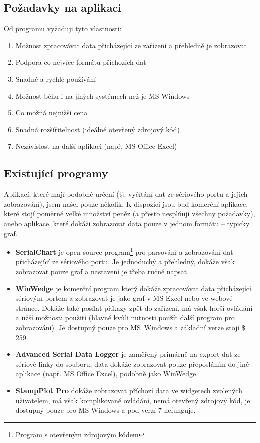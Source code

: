 \documentclass[12pt, a4paper, oneside]{article}
\begin{document}
\subsection*{Požadavky na aplikaci}
Od programu vyžaduji tyto vlastnosti:
\begin{enumerate}
    \item Možnost zpracovávat data přicházející ze zařízení a přehledně je zobrazovat %
    \item Podpora co nejvíce formátů příchozích dat %
    \item Snadné a rychlé používání %
    \item Možnost běhu i na jiných systémech než je MS Windows %
    \item Co možná nejnižší cena %
    \item Snadná rozšířitelnost (ideálně otevřený zdrojový kód) %
    \item Nezávislost na další aplikaci (např. MS Office Excel) %
\end{enumerate}


\subsection*{Existující programy}
Aplikací, které mají podobné určení (tj. vyčítání dat ze sériového portu a jejich zobrazování), jsem našel pouze několik. K dispozici jsou buď komerční aplikace, které stojí poměrně velké množství peněz (a přesto nesplňují všechny požadavky), anebo aplikace, které dokáží zobrazovat data pouze v jednom formátu -- typicky graf.

\begin{itemize}
    \item {\bf SerialChart}\cite{serialchart} je open-source program\footnote{Program s otevřeným zdrojovým kódem} pro parsování a zobrazování dat přicházející ze sériového portu. Je jednoduchý a přehledný, dokáže však zobrazovat pouze graf a nastavení je třeba ručně napsat.
    \item {\bf WinWedge}\cite{winwedge} je komerční program který dokáže zpracovávat data přicházející sériovým portem a zobrazovat je jako graf v MS Excel nebo ve webové stránce. Dokáže také posílat příkazy zpět do zařízení, má však horší ovládání a užší možnosti použití (hlavně kvůli nutnosti použít další program pro zobrazování). Je dostupný pouze pro MS~Windows a základní verze stojí \$ 259.
    \item {\bf Advanced Serial Data Logger}\cite{serialdatalogger} je zaměřený primárně na export dat ze sériové linky do souboru, data dokáže zobrazovat pouze přeposláním do jiné aplikace (např. MS Office Excel), podobně jako WinWedge.
    \item {\bf StampPlot Pro}\cite{stamplot} dokáže zobrazovat příchozí data ve widgetech zvolených uživatelem, má však komplikované ovládání, nemá otevřený zdrojový kód, je dostupný pouze pro MS Windows a pod verzí 7 nefunguje.
\end{itemize}
\end{document}
